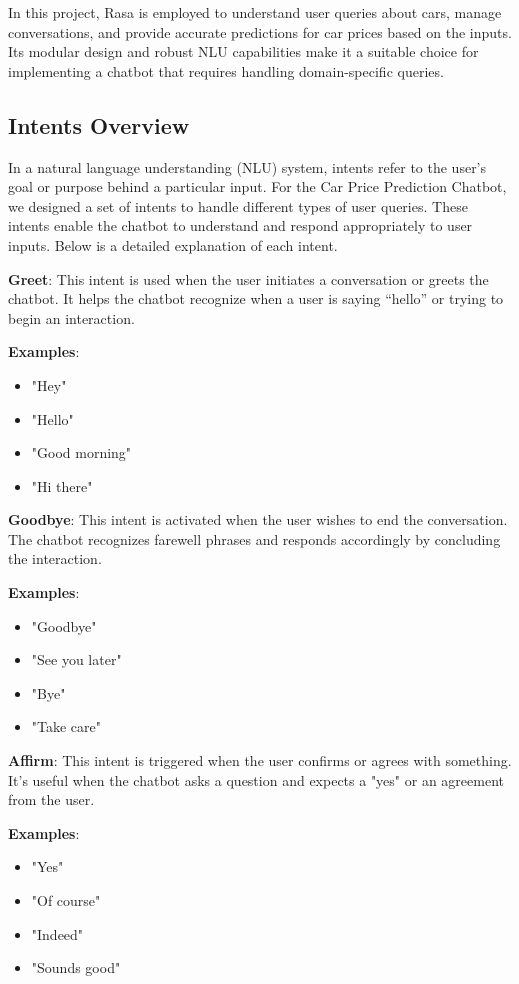 \documentclass[a4paper,12pt]{article}
\begin{document}
In this project, Rasa is employed to understand user queries about cars, manage conversations, and provide accurate predictions for car prices based on the inputs. Its modular design and robust NLU capabilities make it a suitable choice for implementing a chatbot that requires handling domain-specific queries.



\subsection{Intents Overview}

In a natural language understanding (NLU) system, intents refer to the user’s goal or purpose behind a particular input. For the Car Price Prediction Chatbot, we designed a set of intents to handle different types of user queries. These intents enable the chatbot to understand and respond appropriately to user inputs. Below is a detailed explanation of each intent.

\textbf{Greet}: This intent is used when the user initiates a conversation or greets the chatbot. It helps the chatbot recognize when a user is saying “hello” or trying to begin an interaction.

\textbf{Examples}:
\begin{itemize}
    \item "Hey"
    \item "Hello"
    \item "Good morning"
    \item "Hi there"
\end{itemize}

\textbf{Goodbye}: This intent is activated when the user wishes to end the conversation. The chatbot recognizes farewell phrases and responds accordingly by concluding the interaction.

\textbf{Examples}:
\begin{itemize}
    \item "Goodbye"
    \item "See you later"
    \item "Bye"
    \item "Take care"
\end{itemize}

\textbf{Affirm}: This intent is triggered when the user confirms or agrees with something. It’s useful when the chatbot asks a question and expects a "yes" or an agreement from the user.

\textbf{Examples}:
\begin{itemize}
    \item "Yes"
    \item "Of course"
    \item "Indeed"
    \item "Sounds good"
\end{itemize}
\end{document}
